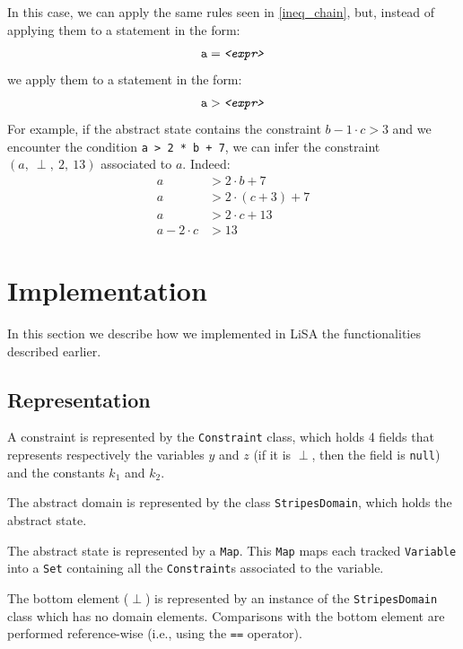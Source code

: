 \documentclass{article}
\newcommand{\spc}{\:}
\begin{document}
In this case, we can apply the same rules seen in \ref{ineq_chain}, but, instead of applying them to a statement in the form:
$$
\mathtt{a = \text{\texttt{\textit{<expr>}}}}
$$
we apply them to a statement in the form:
$$
\mathtt{a > \text{\texttt{\textit{<expr>}}}}
$$
\noindent
For example, if the abstract state contains the constraint $b - 1 \cdot c > 3$ and we encounter the condition \texttt{a > 2 * b + 7}, we can infer the constraint $(a,\spc \perp,\spc 2,\spc 13)$ associated to $a$. Indeed:
\begin{align*}
    a &> 2\cdot b + 7\\
    a &> 2\cdot (c + 3) + 7\\
    a &> 2\cdot c + 13\\
    a - 2\cdot c &> 13
\end{align*}




\section{Implementation}
In this section we describe how we implemented in LiSA \cite{lisa} the functionalities described earlier.

\subsection{Representation}
A constraint is represented by the \texttt{Constraint} class, which holds 4 fields that represents respectively the variables $y$ and $z$ (if it is $\perp$, then the field is \texttt{null}) and the constants $k_1$ and $k_2$.

The abstract domain is represented by the class \texttt{StripesDomain}, which holds the abstract state.

The abstract state is represented by a \texttt{Map}. This \texttt{Map} maps each tracked \texttt{Variable} into a \texttt{Set} containing all the \texttt{Constraint}s associated to the variable.

The bottom element ($\perp$) is represented by an instance of the \texttt{StripesDomain} class which has no domain elements. Comparisons with the bottom element are performed reference-wise (i.e., using the \texttt{==} operator).
\end{document}
